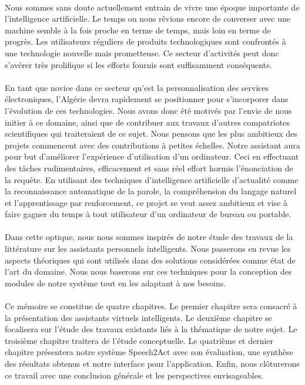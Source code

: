 \paragraph{}
Nous sommes sans doute actuellement entrain de vivre une époque importante de l'intelligence artificielle. Le temps ou nous rêvions encore de converser avec une machine semble à la fois proche en terme de temps, mais loin en terme de progrès. Les utilisateurs réguliers de produits technologiques sont confrontés à une technologie nouvelle mais prometteuse. Ce secteur d'activités peut donc s'avérer très prolifique si les efforts fournis sont suffisamment conséquents.

\paragraph{}
En tant que novice dans ce secteur qu'est la personnalisation des services électroniques, l'Algérie devra rapidement se positionner pour s'incorporer dans l'évolution de ces technologies. Nous avons donc été motivés par l'envie de nous initier à ce domaine, ainsi que de contribuer aux travaux d'autres compatriotes scientifiques qui traiteraient de ce sujet. Nous pensons que les plus ambitieux des projets commencent avec des contributions à petites échelles. Notre assistant aura pour but d'améliorer l'expérience d'utilisation d'un ordinateur. Ceci en effectuant des tâches rudimentaires, efficacement et sans réel effort hormis l'énonciation de la requête. En utilisant des techniques d'intelligence artificielle d'actualité comme la reconnaissance automatique de la parole, la compréhension du langage naturel et l'apprentissage par renforcement, ce projet se veut assez ambitieux et vise à faire gagner du temps à tout utilisateur d'un ordinateur de bureau ou portable.
	
\paragraph{}
Dans cette optique, nous nous sommes inspirés de notre étude des travaux de la littérature sur les assistants personnels intelligents. Nous passerons en revue les aspects théoriques qui sont utilisés dans des solutions considérées comme état de l'art du domaine. Nous nous baserons sur ces techniques pour la conception des modules de notre système tout en les adaptant à nos besoins. 

\paragraph{}
Ce mémoire se constitue de quatre chapitres. Le premier chapitre sera consacré à la présentation des assistants virtuels intelligents. Le deuxième chapitre se focalisera sur l'étude des travaux existants liés à la thématique  de notre sujet. Le troisième chapitre traitera de l'étude conceptuelle. Le quatrième et dernier chapitre présentera notre système Speech2Act avec son évaluation, une synthèse des résultats obtenus et notre interface pour l'application. Enfin, nous clôturerons ce travail avec une conclusion générale et les perspectives envisageables.
